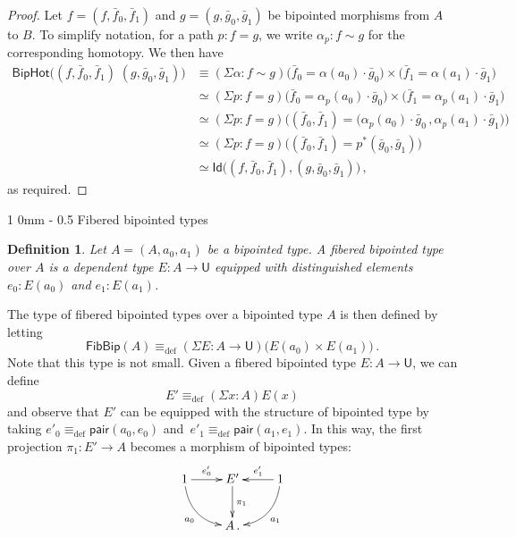 \documentclass[reqno,10pt,a4paper,oneside]{amsart}
\makeatletter
\numberwithin{equation}{section}
\renewcommand{\section}{\@startsection
  {section}%
   {1}%
  {0mm}%
   {-\baselineskip}%
  {0.5\baselineskip}%
   {\Large\bfseries}}%
\theoremstyle{mythm}
\theoremstyle{mydef}
\newtheorem{definition}[theorem]{Definition}
\theoremstyle{myrmk}
\newcommand{\deq}{\equiv}
\newcommand{\defeq}{\deq_{\mathrm{def}}}
\newcommand{\co}{\colon}
\newcommand{\ct}{\cdot}
\newcommand{\pair}{\mathsf{pair}}
\newcommand{\Id}{\mathsf{Id}}
\newcommand{\UU}{\mathsf{U}}
\newcommand{\FibBip}{\mathsf{FibBip}}
\newcommand{\BipHot}{\mathsf{BipHot}}
\makeatother
\begin{document}
\begin{proof} Let  $f = (f, \bar{f}_0, \bar{f}_1)$ and $g = (g, \bar{g}_0, \bar{g}_1)$ be bipointed
morphisms from $A$ to $B$. To simplify notation, for a path $p \co f = g$, we write $\alpha_p \co f \sim g$
for the corresponding homotopy. We then have
\begin{align*}
\BipHot \big( (f,\bar{f}_0,\bar{f}_1) \; (g,\bar{g}_0,\bar{g}_1) \big) & \deq  
(\Sigma \alpha : f \sim g) \big(\bar{f}_0 = \alpha(a_0) \ct \bar{g}_0\big) \times \big(\bar{f}_1 = \alpha(a_1) \ct \bar{g}_1 \big) \\ 
& \simeq  (\Sigma p : f = g) \big(\bar{f}_0 = \alpha_p(a_0) \ct \bar{g}_0\big) \times \big( \bar{f}_1 = \alpha_p(a_1) \ct \bar{g}_1 \big) \\
& \simeq (\Sigma p : f = g) \big((\bar{f}_0,\bar{f}_1) = \big(\alpha_p(a_0) \ct \bar{g}_0 \, ,  \alpha_p(a_1) \ct \bar{g}_1\big) \big) \\
& \simeq (\Sigma p : f = g) \big((\bar{f}_0,\bar{f}_1) = p^{\ast} (\bar{g}_0,\bar{g}_1) \big) \\
& \simeq  \Id \big( (f,\bar{f}_0,\bar{f}_1) , (g,\bar{g}_0,\bar{g}_1)  \big) \, ,
\end{align*} 
as required.
\end{proof}






\section{Fibered bipointed types} 


\begin{definition} \label{def:fibbipointed}
Let $A = (A, a_0, a_1)$ be a bipointed type. A \emph{fibered bipointed type} over $A$ is a dependent type
$E \co A \to \UU$ equipped with distinguished elements $e_0 \co E(a_0)$ and $e_1 \co E(a_1)$.
\end{definition}

The type of  fibered bipointed types over a bipointed type $A$ is then defined by letting
\[
\FibBip(A) \defeq (\Sigma E : A \to \UU)  \big( E(a_0) \times E(a_1) \big) \, .
 \]
 Note that this type is not small. 
Given a fibered bipointed type $E \co A \to \UU$, we can define
\[
E' \defeq (\Sigma x : A) E(x)
\] 
and observe that $E'$ can be equipped with the structure of  bipointed type by taking $e'_0 \defeq \pair(a_0, e_0)$ and~$e'_1 \defeq \pair(a_1, e_1)$.
In this way, the first projection $\pi_1 \co E' \to A$ becomes a morphism of bipointed types:
\[
\xymatrix{
1 \ar@/_1pc/[dr]_{a_0} \ar[r]^-{e'_0} & E' \ar[d]^{\pi_1} & 1 \ar[l]_-{e'_1} \ar@/^1pc/[dl]^{a_1} \\ 
 & A \, .& }
 \]
\end{document}
